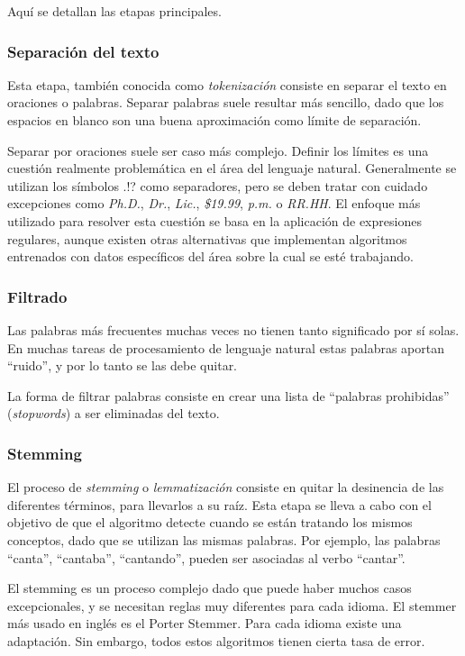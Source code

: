 \documentclass[a4paper]{article}
\begin{document}
Aquí se detallan las etapas principales.

\subsubsection{Separación del texto}
Esta etapa, también conocida como \textit{tokenización} consiste en separar el texto en oraciones o palabras. Separar palabras suele resultar más sencillo, dado que los espacios en blanco son una buena aproximación como límite de separación. 

Separar por oraciones suele ser caso más complejo. Definir los límites es una cuestión realmente problemática en el área del lenguaje natural. Generalmente se utilizan los símbolos .!? como separadores, pero se deben tratar con cuidado excepciones como \textit{Ph.D.}, \textit{Dr.}, \textit{Lic.}, \textit{\$19.99}, \textit{p.m.} o \textit{RR.HH}. El enfoque más utilizado para resolver esta cuestión se basa en la aplicación de expresiones regulares, aunque existen otras alternativas que implementan algoritmos entrenados con datos específicos del área sobre la cual se esté trabajando.


\subsubsection{Filtrado}
Las palabras más frecuentes muchas veces no tienen tanto significado por sí solas. En muchas tareas de procesamiento de lenguaje natural estas palabras aportan “ruido”, y por lo tanto se las debe quitar. 

La forma de filtrar palabras consiste en crear una lista de “palabras prohibidas” (\textit{stopwords}) a ser eliminadas del texto.


\subsubsection{Stemming}
El proceso de \textit{stemming} o \textit{lemmatización} consiste en quitar la desinencia de las diferentes términos, para llevarlos a su raíz. Esta etapa se lleva a cabo con el objetivo de que el algoritmo detecte cuando se están tratando los mismos conceptos, dado que se utilizan las mismas palabras.
Por ejemplo, las palabras “canta”, “cantaba”, “cantando”, pueden ser asociadas al verbo “cantar”.

El stemming es un proceso complejo dado que puede haber muchos casos excepcionales, y se necesitan reglas muy diferentes para cada idioma. El stemmer más usado en inglés es el Porter Stemmer. Para cada idioma existe una adaptación. Sin embargo, todos estos algoritmos tienen cierta tasa de error.
\end{document}
